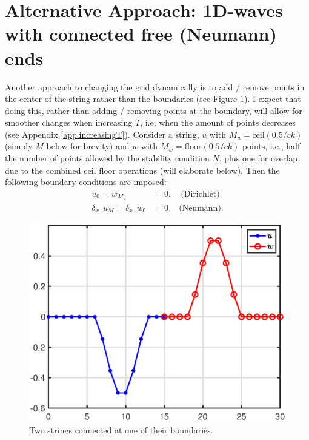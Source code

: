 \documentclass[dvipsnames]{article}
\begin{document}
\section{Alternative Approach: 1D-waves with connected free (Neumann) ends}
Another approach to changing the grid dynamically is to add / remove points in the center of the string rather than the boundaries (see Figure \ref{fig:twoFreeStrings}). I expect that doing this, rather than adding / removing points at the boundary, will allow for smoother changes when increasing $T$, i.e, when the amount of points decreases (see Appendix \ref{app:increasingT}). Consider a string, $u$ with $M_u = \text{ceil}(0.5/ck)$ (simply $M$ below for brevity) and $w$ with $M_w = \text{floor}(0.5/ck)$ points, i.e., half the number of points allowed by the stability condition $N$, plus one for overlap due to the combined $\text{ceil}$ $\text{floor}$ operations (will elaborate below). Then the following boundary conditions are imposed:
\begin{equation}\label{eq:halfStringBoundaryCond}
    \begin{aligned}
        u_0 = w_{M_w} &= 0,\quad \text{(Dirichlet)}\\
        \delta_{x\cdot}u_M = \delta_{x\cdot}w_0 &= 0\ \quad \text{(Neumann)}.
    \end{aligned}
\end{equation}

\begin{figure}[h]
\centerline{\includegraphics[width=0.6\columnwidth]{twoFreeStrings.eps} }
\caption{\label{fig:twoFreeStrings}{Two strings connected at one of their boundaries.}}
\end{figure}
\end{document}
